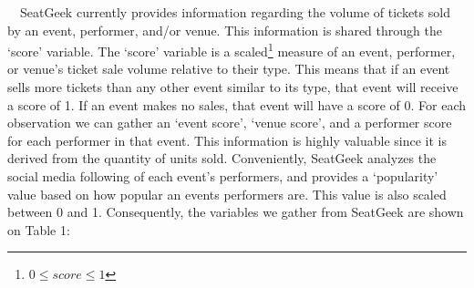 \documentclass[
]{article}
\begin{document}
~~SeatGeek currently provides information regarding the volume of
tickets sold by an event, performer, and/or venue. This information is
shared through the `score' variable. The `score' variable is a
scaled\footnote{\(0 \le score \le 1\)} measure of an event, performer,
or venue's ticket sale volume relative to their type. This means that if
an event sells more tickets than any other event similar to its type,
that event will receive a score of 1. If an event makes no sales, that
event will have a score of 0. For each observation we can gather an
`event score', `venue score', and a performer score for each performer
in that event. This information is highly valuable since it is derived
from the quantity of units sold. Conveniently, SeatGeek analyzes the
social media following of each event's performers, and provides a
`popularity' value based on how popular an events performers are. This
value is also scaled between 0 and 1. Consequently, the variables we
gather from SeatGeek are shown on Table 1:

  
\end{document}
